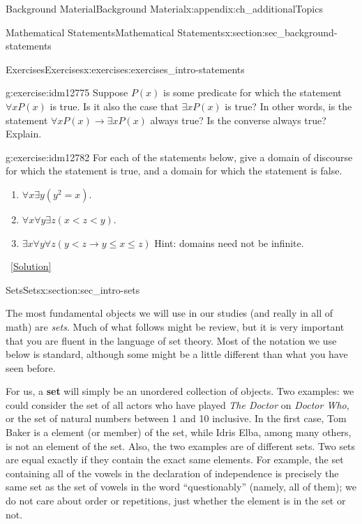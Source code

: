 \documentclass[oneside,10pt,]{book}
\newcommand{\terminology}[1]{\textbf{#1}}
\numberwithin{equation}{chapter}
\def\imp{\rightarrow}
\newcommand{\lt}{<}
\begin{document}
\begin{appendixptx}{Background Material}{}{Background Material}{}{}{x:appendix:ch_additionalTopics}
\begin{sectionptx}{Mathematical Statements}{}{Mathematical Statements}{}{}{x:section:sec_background-statements}
\begin{exercises-subsection}{Exercises}{}{Exercises}{}{}{x:exercises:exercises_intro-statements}
\begin{divisionexercise}{9}{}{}{g:exercise:idm12775}
Suppose \(P(x)\) is some predicate for which the statement \(\forall x P(x)\) is true. Is it also the case that \(\exists x P(x)\) is true? In other words, is the statement \(\forall x P(x) \imp \exists x P(x)\) always true? Is the converse always true? Explain.%
\end{divisionexercise}%
\begin{divisionexercise}{10}{}{}{g:exercise:idm12782}%
For each of the statements below, give a domain of discourse for which the statement is true, and a domain for which the statement is false.%
\par
%
\begin{enumerate}[label=(\alph*)]
\item{}\(\forall x \exists y (y^2 = x)\).%
\item{}\(\forall x \forall y \exists z (x \lt  z \lt  y)\).%
\item{}\(\exists x \forall y \forall z (y \lt  z \imp y \le x \le z)\) Hint: domains need not be infinite.%
\end{enumerate}
%
\qquad~\hfill{\tiny\hyperlink{g:solution:idm12793-main}{[Solution]}}\end{divisionexercise}%
\end{exercises-subsection}
\end{sectionptx}
%
%
\typeout{************************************************}
\typeout{************************************************}
%
\begin{sectionptx}{Sets}{}{Sets}{}{}{x:section:sec_intro-sets}
\begin{introduction}{}%
The most fundamental objects we will use in our studies (and really in all of math) are \emph{sets}. Much of what follows might be review, but it is very important that you are fluent in the language of set theory. Most of the notation we use below is standard, although some might be a little different than what you have seen before.%
\par
For us, a \terminology{set}  will simply be an unordered collection of objects. Two examples: we could consider the set of all actors who have played \emph{The Doctor} on \emph{Doctor Who}, or the set of natural numbers between 1 and 10 inclusive. In the first case, Tom Baker is a element (or member) of the set, while Idris Elba, among many others, is not an element of the set. Also, the two examples are of different sets. Two sets are equal exactly if they contain the exact same elements. For example, the set containing all of the vowels in the declaration of independence is precisely the same set as the set of vowels in the word ``questionably'' (namely, all of them); we do not care about order or repetitions, just whether the element is in the set or not.%

\end{introduction}
\end{sectionptx}
\end{appendixptx}
\end{document}
